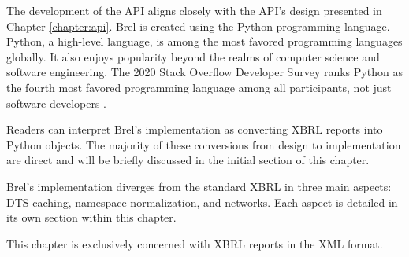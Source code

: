 



The development of the API aligns closely with the API's design presented in Chapter \ref{chapter:api}.
Brel is created using the Python programming language.
Python, a high-level language, is among the most favored programming languages globally.
It also enjoys popularity beyond the realms of computer science and software engineering.
The 2020 Stack Overflow Developer Survey ranks Python as the fourth most favored programming language among all participants, not just software developers \cite{stack_overflow_2020}.

Readers can interpret Brel's implementation as converting XBRL reports into Python objects.
The majority of these conversions from design to implementation are direct and will be briefly discussed in the initial section of this chapter.

Brel's implementation diverges from the standard XBRL in three main aspects: DTS caching, namespace normalization, and networks. Each aspect is detailed in its own section within this chapter.

This chapter is exclusively concerned with XBRL reports in the XML format.
